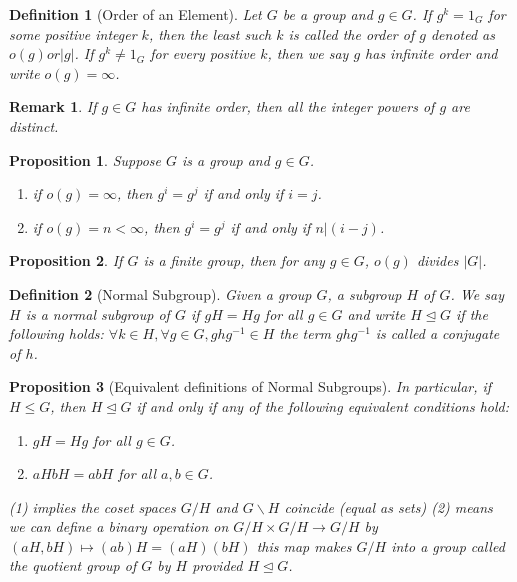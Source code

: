 \documentclass[12pt]{article}
\newtheorem{definition}{Definition}[section]
\newtheorem{proposition}{Proposition}[section]
\newtheorem{remark}{Remark}[section]
\begin{document}
\begin{definition}[Order of an Element]
Let $G$ be a group and $g \in G$.  
If $g^k = 1_G$ for some positive integer $k$, then the least such $k$ is called the \emph{order} of $g$ denoted as $o(g) or |g|$.
If $g^k \neq 1_G$ for every positive $k$, then we say $g$ has infinite order and write $o(g) = \infty$.
\end{definition}
\begin{remark}
    If $g \in G$ has infinite order, then all the integer powers of $g$ are distinct.
\end{remark}

\begin{proposition}
    Suppose $G$ is a group and $g \in G$.
    \begin{enumerate}
        \item if $o(g) = \infty$, then $g^i = g^j$ if and only if $i = j$.
        \item if $o(g) = n < \infty$, then $g^i = g^j$ if and only if $n | (i-j)$.
    \end{enumerate}
\end{proposition}

\begin{proposition}
If $G$ is a finite group, then for any $g \in G$, $o(g)$ divides $|G|$.
\end{proposition}

\begin{definition}[Normal Subgroup]
Given a group $G$, a subgroup $H$ of $G$. We say $H$ is a \emph{normal subgroup} of $G$ if $gH = Hg$ for all $g \in G$ and write $H \trianglelefteq G$ if the following holds: $\forall k \in H, \forall g \in G, ghg^{-1} \in H$ the term $ghg^{-1}$ is called a conjugate of $h$.
\end{definition}

\begin{proposition}[Equivalent definitions of Normal Subgroups]
    In particular, if $H \leq G$, then $H \trianglelefteq G$ if and only if any of the following equivalent conditions hold:
    \begin{enumerate}
        \item $gH = Hg$ for all $g \in G$.
        \item $aHbH = abH$ for all $a,b \in G$.
    \end{enumerate}
    (1) implies the coset spaces $G/H$ and $G\backslash H$ coincide (equal as sets)
    (2) means we can define a binary operation on $G/H \times G/H \to G/H$ by $(aH,bH) \mapsto (ab)H = (aH)(bH)$ 
    this map makes $G/H$ into a group called the quotient group of $G$ by $H$ provided $H \trianglelefteq G$.
\end{proposition}
\end{document}
